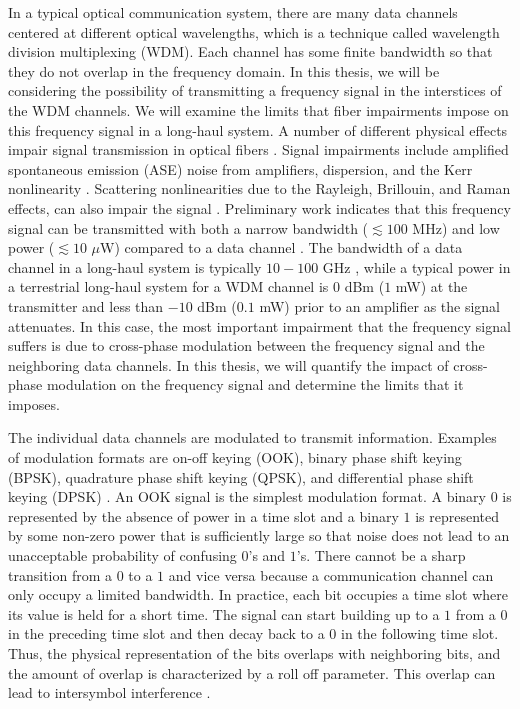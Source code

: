 In a typical optical communication system, there are many data channels centered at different optical wavelengths, which is a technique called wavelength division multiplexing (WDM).  Each channel has some finite bandwidth so that they do not overlap in the frequency domain.  In this thesis, we will be considering the possibility of transmitting a frequency signal in the interstices of the WDM channels. We will examine the limits that fiber impairments impose on this frequency signal in a long-haul system.  A number of different physical effects impair signal transmission in optical fibers \cite{agrawal2012fiber}. Signal impairments include amplified spontaneous emission (ASE) noise from amplifiers, dispersion, and the Kerr nonlinearity \cite{agrawal2012fiber}.  Scattering nonlinearities due to the Rayleigh, Brillouin, and Raman effects, can also impair the signal \cite{agrawal2012fiber,Agrawal2013}.  Preliminary work indicates that this frequency signal can be transmitted with both a narrow bandwidth ($\lesssim 100$ MHz) and low power ($\lesssim 10$ $\mu$W) compared to a data channel \cite{menyukIFCS2015}.  The bandwidth of a data channel in a long-haul system is typically $10-100$ GHz \cite{ITU-T2012}, while a typical power in a terrestrial long-haul system for a WDM channel is $0$ dBm ($1$ mW) at the transmitter and less than $-10$ dBm ($0.1$ mW) prior to an amplifier as the signal attenuates.  In this case, the most important impairment that the frequency signal suffers is due to cross-phase modulation between the frequency signal and the neighboring data channels.  In this thesis, we will quantify the impact of cross-phase modulation on the frequency signal and determine the limits that it imposes.


The individual data channels are modulated to transmit information.  Examples of modulation formats are on-off keying (OOK), binary phase shift keying (BPSK), quadrature phase shift keying (QPSK), and differential phase shift keying (DPSK) \cite{agrawal2012fiber}.  An OOK signal is the simplest modulation format. A binary $0$ is represented by the absence of power in a time slot and a binary $1$ is represented by some non-zero power that is sufficiently large so that noise does not lead to an unacceptable probability of confusing $0$'s and $1$'s.  There cannot be a sharp transition from a $0$ to a $1$ and vice versa because a communication channel can only occupy a limited bandwidth.  In practice, each bit occupies a time slot where its value is held for a short time.  The signal can start building up to a $1$ from a $0$ in the preceding time slot and then decay back to a $0$ in the following time slot. Thus, the physical representation of the bits overlaps with neighboring bits, and the amount of overlap is characterized by a roll off parameter.  This overlap can lead to intersymbol interference \cite{proakis2001digital}.

